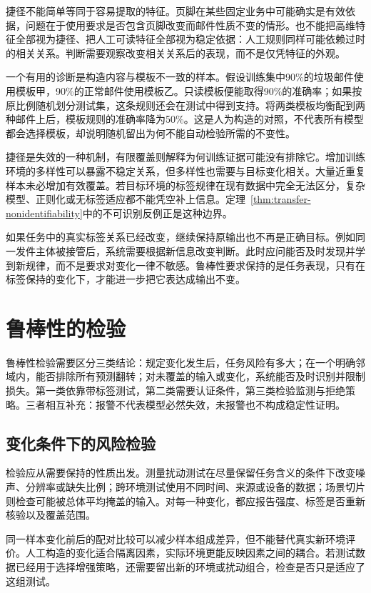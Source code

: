 捷径不能简单等同于容易提取的特征。页脚在某些固定业务中可能确实是有效依据，问题在于使用要求是否包含页脚改变而邮件性质不变的情形。也不能把高维特征全部视为捷径、把人工可读特征全部视为稳定依据：人工规则同样可能依赖过时的相关关系。判断需要观察改变相关关系后的表现，而不是仅凭特征的外观。

一个有用的诊断是构造内容与模板不一致的样本。假设训练集中90\%的垃圾邮件使用模板甲，90\%的正常邮件使用模板乙。只读模板便能取得90\%的准确率；如果按原比例随机划分测试集，这条规则还会在测试中得到支持。将两类模板均衡配到两种邮件上后，模板规则的准确率降为50\%。这是人为构造的对照，不代表所有模型都会选择模板，却说明随机留出为何不能自动检验所需的不变性。

捷径是失效的一种机制，有限覆盖则解释为何训练证据可能没有排除它。增加训练环境的多样性可以暴露不稳定关系，但多样性也需要与目标变化相关。大量近重复样本未必增加有效覆盖。若目标环境的标签规律在现有数据中完全无法区分，复杂模型、正则化或无标签适应都不能凭空补上信息。定理~\ref{thm:transfer-nonidentifiability}中的不可识别反例正是这种边界。

如果任务中的真实标签关系已经改变，继续保持原输出也不再是正确目标。例如同一发件主体被接管后，系统需要根据新信息改变判断。此时应问能否及时发现并学到新规律，而不是要求对变化一律不敏感。鲁棒性要求保持的是任务表现，只有在标签保持的变化下，才能进一步把它表达成输出不变。

\section{鲁棒性的检验}
\label{sec:robustness-evaluation}

鲁棒性检验需要区分三类结论：规定变化发生后，任务风险有多大；在一个明确邻域内，能否排除所有预测翻转；对未覆盖的输入或变化，系统能否及时识别并限制损失。第一类依靠带标签测试，第二类需要认证条件，第三类检验监测与拒绝策略。三者相互补充：报警不代表模型必然失效，未报警也不构成稳定性证明。

\subsection{变化条件下的风险检验}
\label{sec:robustness-risk-test}

检验应从需要保持的性质出发。测量扰动测试在尽量保留任务含义的条件下改变噪声、分辨率或缺失比例；跨环境测试使用不同时间、来源或设备的数据；场景切片则检查可能被总体平均掩盖的输入。对每一种变化，都应报告强度、标签是否重新核验以及覆盖范围。

同一样本变化前后的配对比较可以减少样本组成差异，但不能替代真实新环境评价。人工构造的变化适合隔离因素，实际环境更能反映因素之间的耦合。若测试数据已经用于选择增强策略，还需要留出新的环境或扰动组合，检查是否只是适应了这组测试。

